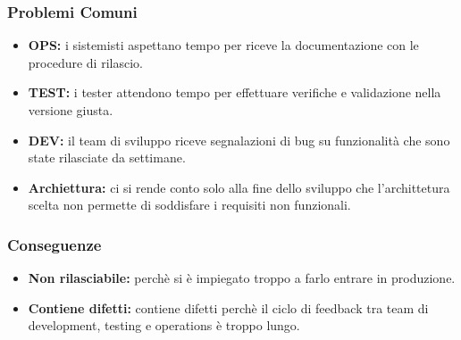\subsubsection{Problemi Comuni}
\begin{itemize}
    \item \textbf{OPS:} i sistemisti aspettano tempo per riceve la documentazione con le procedure di rilascio.
    \item \textbf{TEST:} i tester attendono tempo per effettuare verifiche e validazione nella versione giusta.
    \item \textbf{DEV:} il team di sviluppo riceve segnalazioni di bug su funzionalità che sono state rilasciate da settimane.
    \item \textbf{Archiettura:} ci si rende conto solo alla fine dello sviluppo che l’archittetura scelta non permette di soddisfare i requisiti non funzionali.
\end{itemize}


\subsubsection{Conseguenze}
\begin{itemize}
    \item \textbf{Non rilasciabile:} perchè si è impiegato troppo a farlo entrare in produzione.
    \item \textbf{Contiene difetti:} contiene difetti perchè il ciclo di feedback tra team di development, testing e operations è troppo lungo.
\end{itemize}









\newpage